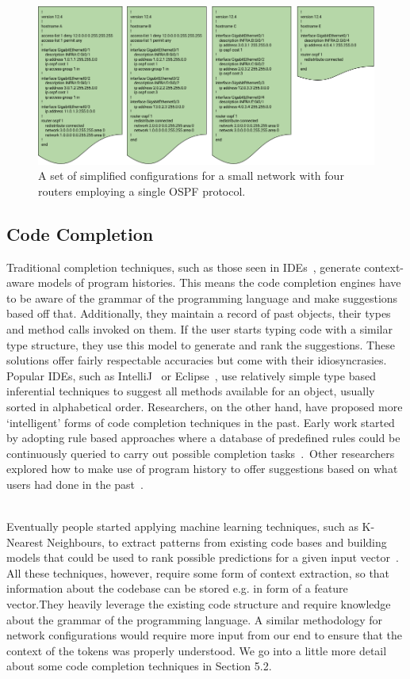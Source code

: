 \begin{figure}[H]
	\centering
	\includegraphics[width=5in]{configexample.png}
	\caption{A set of simplified configurations for a small network with four routers employing a single OSPF protocol.}
\end{figure}

\subsection{Code Completion}

Traditional completion techniques, such as those seen in IDEs~\cite{intelliJ-completion}, generate context-aware models of program histories.
This means the code completion engines have to be aware of the grammar of the programming language and make suggestions based off that. Additionally, they maintain a record of past objects, their types and method calls invoked on them. If the user starts typing code with a similar type structure, they use this model to generate and rank the suggestions. These solutions offer fairly respectable accuracies but come with their idiosyncrasies. Popular IDEs, such as IntelliJ~\cite{intelliJ} or Eclipse~\cite{eclipse}, use relatively simple type based inferential techniques to suggest all methods available for an object, usually sorted in alphabetical order. Researchers, on the other hand, have proposed more ‘intelligent’ forms of code completion techniques in the past. Early work started by adopting rule based approaches where a database of predefined rules could be continuously queried to carry out possible completion tasks~\cite{kaiser}.  Other researchers explored how to make use of program history to offer suggestions based on what users had done in the past~\cite{robbes}.\\  

Eventually people started applying machine learning techniques, such as K-Nearest Neighbours, to extract patterns from existing code bases and building models that could be used to rank possible predictions for a given input vector~\cite{bruch}. All these techniques, however, require some form of context extraction, so that information about the codebase can be stored e.g. in form of a feature vector.They heavily leverage the existing code structure and require knowledge about the grammar of the programming language. A similar methodology for network configurations would require more input from our end to ensure that the context of the tokens was properly understood. We go into a little more detail about some code completion techniques in Section 5.2.

